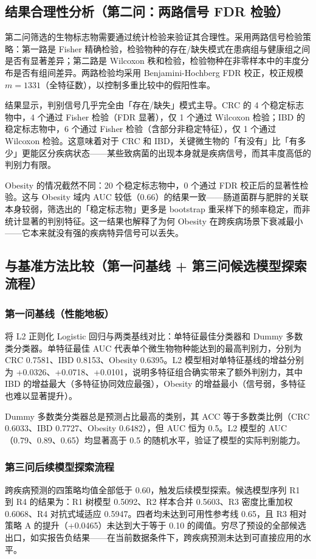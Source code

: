 \subsection{结果合理性分析（第二问：两路信号 FDR 检验）}

第二问筛选的生物标志物需要通过统计检验来验证其合理性。采用两路信号检验策略：第一路是 Fisher 精确检验，检验物种的存在/缺失模式在患病组与健康组之间是否有显著差异；第二路是 Wilcoxon 秩和检验，检验物种在非零样本中的丰度分布是否有组间差异。两路检验均采用 Benjamini-Hochberg FDR 校正，校正规模 $m=1331$（全特征数），以控制多重比较中的假阳性率。

结果显示，判别信号几乎完全由「存在/缺失」模式主导。CRC 的 4 个稳定标志物中，4 个通过 Fisher 检验（FDR 显著），仅 1 个通过 Wilcoxon 检验；IBD 的稳定标志物中，6 个通过 Fisher 检验（含部分非稳定特征），仅 1 个通过 Wilcoxon 检验。这意味着对于 CRC 和 IBD，关键微生物的「有没有」比「有多少」更能区分疾病状态——某些致病菌的出现本身就是疾病信号，而其丰度高低的判别力有限。

Obesity 的情况截然不同：20 个稳定标志物中，0 个通过 FDR 校正后的显著性检验。这与 Obesity 域内 AUC 较低（0.66）的结果一致——肠道菌群与肥胖的关联本身较弱，筛选出的「稳定标志物」更多是 bootstrap 重采样下的频率稳定，而非统计显著的判别特征。这一结果也解释了为何 Obesity 在跨疾病场景下衰减最小——它本来就没有强的疾病特异信号可以丢失。

\subsection{与基准方法比较（第一问基线 + 第三问候选模型探索流程）}

\subsubsection{第一问基线（性能地板）}

将 L2 正则化 Logistic 回归与两类基线对比：单特征最佳分类器和 Dummy 多数类分类器。单特征最佳 AUC 代表单个微生物物种能达到的最高判别力，分别为 CRC 0.7581、IBD 0.8153、Obesity 0.6395。L2 模型相对单特征基线的增益分别为 +0.0326、+0.0718、+0.0101，说明多特征组合确实带来了额外判别力，其中 IBD 的增益最大（多特征协同效应最强），Obesity 的增益最小（信号弱，多特征也难以显著提升）。

Dummy 多数类分类器总是预测占比最高的类别，其 ACC 等于多数类比例（CRC 0.6033、IBD 0.7727、Obesity 0.6482），但 AUC 恒为 0.5。L2 模型的 AUC（0.79、0.89、0.65）均显著高于 0.5 的随机水平，验证了模型的实际判别能力。

\subsubsection{第三问后续模型探索流程}

跨疾病预测的四策略均值全部低于 0.60，触发后续模型探索。候选模型序列 R1 到 R4 的结果为：R1 树模型 0.5092、R2 样本合并 0.5603、R3 密度比重加权 0.6068、R4 对抗式域适应 0.5947。四者均未达到可用性参考线 0.65，且 R3 相对策略 A 的提升（+0.0465）未达到大于等于 0.10 的阈值。穷尽了预设的全部候选出口，如实报告负结果——在当前数据条件下，跨疾病预测未达到可直接应用的水平。
